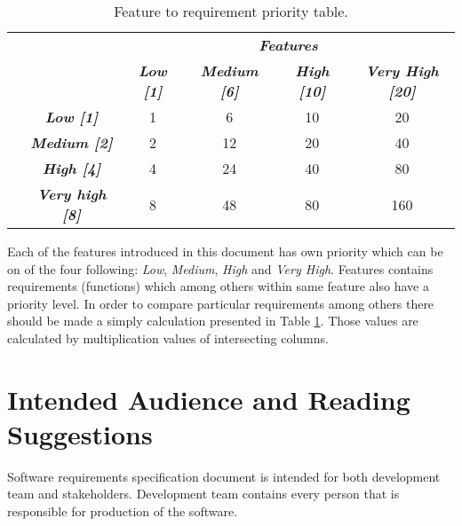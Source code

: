 	\begin{table}[!htbp]
		\centering
		\begin{tabular}{cc|c|c|c|c|}
			\cline{3-6}
			&  & \multicolumn{4}{c|}{\textit{\textbf{Features}}} \\ \cline{3-6} 
			&  & \textit{\textbf{Low {[}1{]}}} & \textit{\textbf{Medium {[}6{]}}} & \textit{\textbf{High {[}10{]}}} & \textit{\textbf{Very High {[}20{]}}} \\ \hline
			\multicolumn{1}{|c|}{\multirow{4}{*}{\rotatebox[origin=c]{90}{\textit{\textbf{Functions}}}}} & \textit{\textbf{Low {[}1{]}}} & 1 & 6 & 10 & 20 \\ \cline{2-6} 
			\multicolumn{1}{|c|}{} & \textit{\textbf{Medium {[}2{]}}} & 2 & 12 & 20 & 40 \\ \cline{2-6} 
			\multicolumn{1}{|c|}{} & \textit{\textbf{High {[}4{]}}} & 4 & 24 & 40 & 80 \\ \cline{2-6} 
			\multicolumn{1}{|c|}{} & \textit{\textbf{Very high {[}8{]}}} & 8 & 48 & 80 & 160 \\ \hline
		\end{tabular}
		\caption{Feature to requirement priority table.}
		\label{tab:feature-to-requirement-priority-table}
	\end{table}
	
	Each of the features introduced in this document has own priority which can be on of the four following: \emph{Low}, \emph{Medium}, \emph{High} and \emph{Very High}. Features contains requirements (functions) which among others within same feature also have a priority level. In order to compare particular requirements among others there should be made a simply calculation presented in Table \ref{tab:feature-to-requirement-priority-table}. Those values are calculated by multiplication values of intersecting columns. 
\section{Intended Audience and Reading Suggestions}
	\begin{comment}
		$<$Describe the different types of reader that the document is intended for, 
		such as developers, project managers, marketing staff, users, testers, and 
		documentation writers. Describe what the rest of this SRS contains and how it is 
		organized. Suggest a sequence for reading the document, beginning with the 
		overview sections and proceeding through the sections that are most pertinent to 
		each reader type.$>$
	\end{comment}
	Software requirements specification document is intended for both development team and stakeholders. Development team contains every person that is responsible for production of the software.
	
